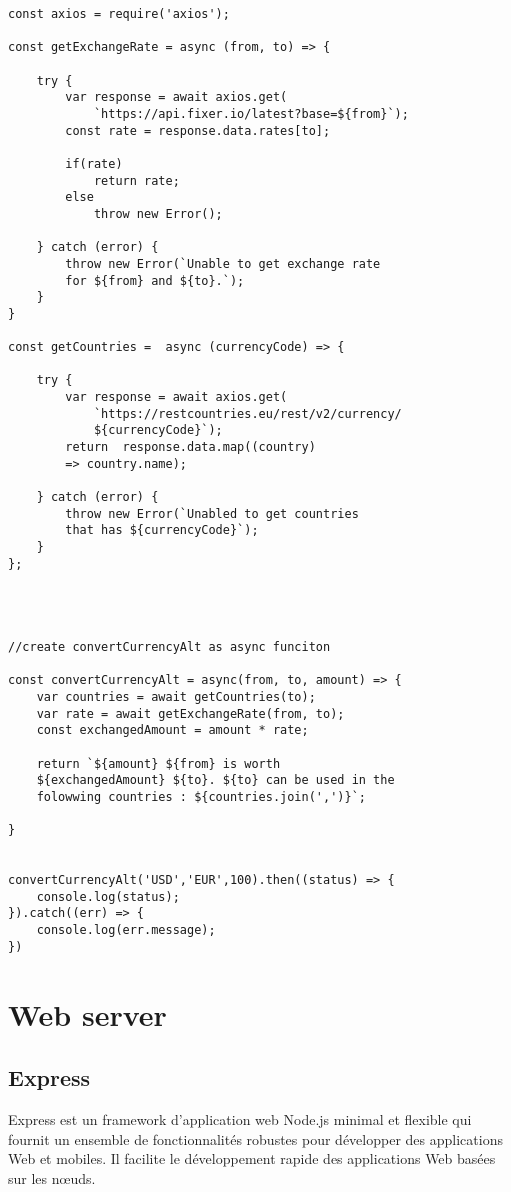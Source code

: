 \documentclass[a4paper,10pt]{article}
\begin{document}
\begin{lstlisting}[frame=single]
    const axios = require('axios');

const getExchangeRate = async (from, to) => {

    try {
        var response = await axios.get(
            `https://api.fixer.io/latest?base=${from}`);
        const rate = response.data.rates[to];

        if(rate)
            return rate;
        else 
            throw new Error();
        
    } catch (error) {
        throw new Error(`Unable to get exchange rate 
        for ${from} and ${to}.`);    
    }
}

const getCountries =  async (currencyCode) => {

    try {
        var response = await axios.get(
            `https://restcountries.eu/rest/v2/currency/
            ${currencyCode}`);
        return  response.data.map((country) 
        => country.name);
        
    } catch (error) {
        throw new Error(`Unabled to get countries 
        that has ${currencyCode}`);
    }
};




//create convertCurrencyAlt as async funciton

const convertCurrencyAlt = async(from, to, amount) => {
    var countries = await getCountries(to);
    var rate = await getExchangeRate(from, to);
    const exchangedAmount = amount * rate;

    return `${amount} ${from} is worth 
    ${exchangedAmount} ${to}. ${to} can be used in the 
    folowwing countries : ${countries.join(',')}`;

}


convertCurrencyAlt('USD','EUR',100).then((status) => {
    console.log(status);
}).catch((err) => {
    console.log(err.message);
})
\end{lstlisting}

\section{Web server}
\subsection{Express}
Express est un framework d'application web Node.js minimal et flexible qui fournit un ensemble de fonctionnalités robustes pour développer des applications Web et mobiles. Il facilite le développement rapide des applications Web basées sur les nœuds. 
\end{document}
